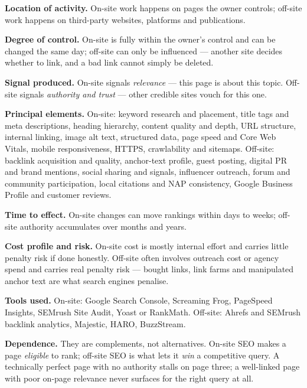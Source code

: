 \begin{qlist}
\begin{apts}
\item \textbf{Location of activity.} On-site work happens on pages the owner
      controls; off-site work happens on third-party websites, platforms and
      publications.
\item \textbf{Degree of control.} On-site is fully within the owner's control
      and can be changed the same day; off-site can only be influenced ---
      another site decides whether to link, and a bad link cannot simply be
      deleted.
\item \textbf{Signal produced.} On-site signals \emph{relevance} --- this page
      is about this topic. Off-site signals \emph{authority and trust} ---
      other credible sites vouch for this one.
\item \textbf{Principal elements.} On-site: keyword research and placement,
      title tags and meta descriptions, heading hierarchy, content quality and
      depth, URL structure, internal linking, image alt text, structured data,
      page speed and Core Web Vitals, mobile responsiveness, HTTPS,
      crawlability and sitemaps. Off-site: backlink acquisition and quality,
      anchor-text profile, guest posting, digital PR and brand mentions,
      social sharing and signals, influencer outreach, forum and community
      participation, local citations and NAP consistency, Google Business
      Profile and customer reviews.
\item \textbf{Time to effect.} On-site changes can move rankings within days to
      weeks; off-site authority accumulates over months and years.
\item \textbf{Cost profile and risk.} On-site cost is mostly internal effort
      and carries little penalty risk if done honestly. Off-site often involves
      outreach cost or agency spend and carries real penalty risk --- bought
      links, link farms and manipulated anchor text are what search engines
      penalise.
\item \textbf{Tools used.} On-site: Google Search Console, Screaming Frog,
      PageSpeed Insights, SEMrush Site Audit, Yoast or RankMath. Off-site:
      Ahrefs and SEMrush backlink analytics, Majestic, HARO, BuzzStream.
\item \textbf{Dependence.} They are complements, not alternatives. On-site SEO
      makes a page \emph{eligible} to rank; off-site SEO is what lets it
      \emph{win} a competitive query. A technically perfect page with no
      authority stalls on page three; a well-linked page with poor on-page
      relevance never surfaces for the right query at all.
\end{apts}


\end{qlist}
